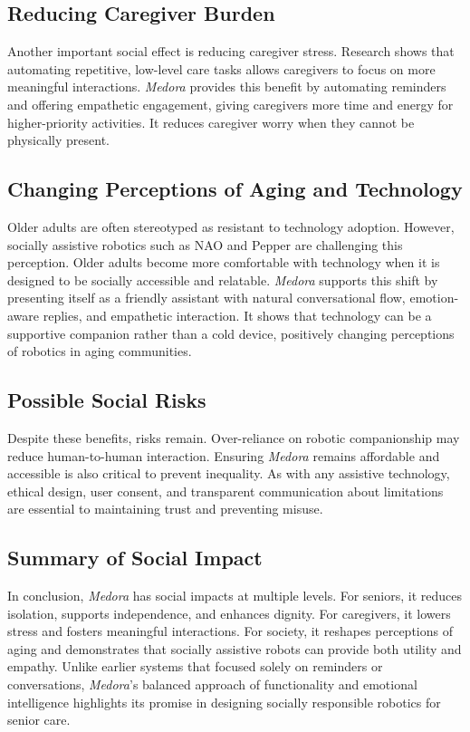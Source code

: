 \subsection{Reducing Caregiver Burden}

Another important social effect is reducing caregiver stress. Research shows that automating repetitive, low-level care tasks allows caregivers to focus on more meaningful interactions. \textit{Medora} provides this benefit by automating reminders and offering empathetic engagement, giving caregivers more time and energy for higher-priority activities. It reduces caregiver worry when they cannot be physically present.

\subsection{Changing Perceptions of Aging and Technology}

Older adults are often stereotyped as resistant to technology adoption. However, socially assistive robotics such as NAO and Pepper are challenging this perception. Older adults become more comfortable with technology when it is designed to be socially accessible and relatable. \textit{Medora} supports this shift by presenting itself as a friendly assistant with natural conversational flow, emotion-aware replies, and empathetic interaction. It shows that technology can be a supportive companion rather than a cold device, positively changing perceptions of robotics in aging communities.

\subsection{Possible Social Risks}

Despite these benefits, risks remain. Over-reliance on robotic companionship may reduce human-to-human interaction. Ensuring \textit{Medora} remains affordable and accessible is also critical to prevent inequality. As with any assistive technology, ethical design, user consent, and transparent communication about limitations are essential to maintaining trust and preventing misuse.

\subsection{Summary of Social Impact}

In conclusion, \textit{Medora} has social impacts at multiple levels. For seniors, it reduces isolation, supports independence, and enhances dignity. For caregivers, it lowers stress and fosters meaningful interactions. For society, it reshapes perceptions of aging and demonstrates that socially assistive robots can provide both utility and empathy. Unlike earlier systems that focused solely on reminders or conversations, \textit{Medora}'s balanced approach of functionality and emotional intelligence highlights its promise in designing socially responsible robotics for senior care.

